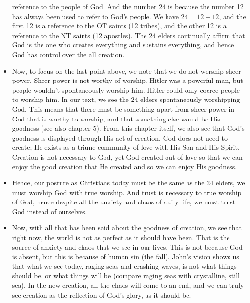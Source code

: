 \begin{itemize}
{\begin{itemize}
{    reference to the people of God.  And the number 24 is because the number
    12 has always been used to refer to God's people.  We have $24 = 12 +
    12$, and the first 12 is a reference to the OT saints (12 tribes), and
    the other 12 is a reference to the NT saints (12 apostles).  The 24
    elders continually affirm that God is the one who creates everything and
    sustains everything, and hence God has control over the all creation.}
  \end{itemize}}
  \item{Now, to focus on the last point above, we note that we do not worship
  sheer power.  Sheer power is not worthy of worship.  Hitler was a powerful
  man, but people wouldn't spontaneously worship him.  Hitler could only
  coerce people to worship him.  In our text, we see the 24 elders
  spontaneously worshipping God.  This means that there must be something
  apart from sheer power in God that is worthy to worship, and that something
  else would be His goodness (see also chapter 5).  From this chapter itself,
  we also see that God's goodness is displayed through His act of creation.
  God does not need to create; He exists as a triune community of love with
  His Son and His Spirit.  Creation is not necessary to God, yet God created
  out of love so that we can enjoy the good creation that He created and so
  we can enjoy His goodness.}
  \item{Hence, our posture as Christians today must be the same as the 24
  elders, we must worship God with true worship.  And trust is necessary to
  true worship of God; hence despite all the anxiety and chaos of daily life, we must trust God instead of ourselves. }
  \item{Now, with all that has been said about the goodness of creation, we
  see that right now, the world is not as perfect as it should have been.
  That is the source of anxiety and chaos that we see in our lives.  This is
  not because God is absent, but this is because of human sin (the fall).
  John's vision shows us that what we see today, raging seas and crashing
  waves, is not what things should be, or what things will be (compare raging
  seas with crystalline, still sea).  In the new creation, all the chaos will
  come to an end, and we can truly see creation as the reflection of God's
  glory, as it should be.}
\end{itemize}